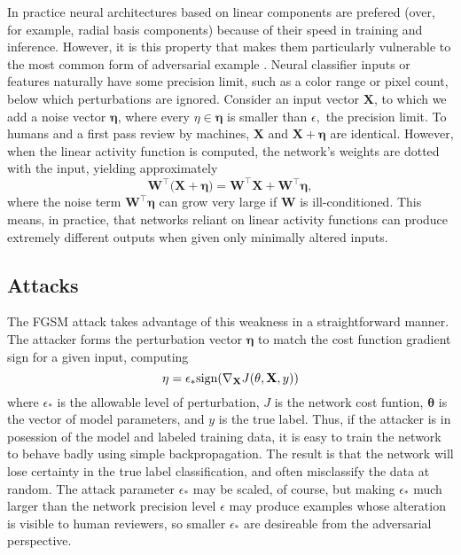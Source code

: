 \documentclass[conference]{IEEEtran}
\begin{document}
In practice neural architectures based on linear components are prefered
(over, for example, radial basis components) because of their speed in
training and inference. However, it is this property that makes them
particularly vulnerable to the most common form of adversarial example \cite%
{goodfellow2014explaining}. Neural classifier inputs or features naturally
have some precision limit, such as a color range or pixel count, below which
perturbations are ignored. Consider an input vector $\mathbf{X}$, to which
we add a noise vector $\mathbf{\eta }$, where every $\eta \in \mathbf{\eta }$
is smaller than $\epsilon ,$ the precision limit. To humans and a first pass
review by machines, $\mathbf{X}$ and $\mathbf{X+\eta }$ are identical.
However, when the linear activity function is computed, the network's
weights are dotted with the input, yielding approximately 
\[
\mathbf{W}^{\intercal }(\mathbf{X+\eta )=W}^{\intercal }\mathbf{X+W}%
^{\intercal }\mathbf{\eta ,}
\]%
where the noise term $\mathbf{W}^{\intercal }\mathbf{\eta }$ can grow very
large if $\mathbf{W}$ is ill-conditioned. This means, in practice, that
networks reliant on linear activity functions can produce extremely
different outputs when given only minimally altered inputs. 

\subsection{Attacks}

The FGSM attack \cite{goodfellow2014explaining} takes advantage of this
weakness in a straightforward manner. The attacker forms the perturbation
vector $\mathbf{\eta }$ to match the cost function gradient sign for a given
input, computing 
\[
\mathbf{\eta }=\epsilon _{\ast }\text{sign}(\nabla _{\mathbf{X}}J(\mathbf{%
\theta },\mathbf{X},y))
\]%
where $\epsilon _{\ast }$ is the allowable level of perturbation, $J$ is the
network cost funtion, $\mathbf{\theta }$ is the vector of model parameters,
and $y$ is the true label. Thus, if the attacker is in posession of the
model and labeled training data, it is easy to train the network to behave
badly using simple backpropagation. The result is that the network will lose
certainty in the true label classification, and often misclassify the data
at random. The attack parameter $\epsilon _{\ast }$ may be scaled, of
course, but making $\epsilon _{\ast }$ much larger than the network
precision level $\epsilon $ may produce examples whose alteration is visible
to human reviewers, so smaller $\epsilon _{\ast }$ are desireable from the
adversarial perspective.
\end{document}
